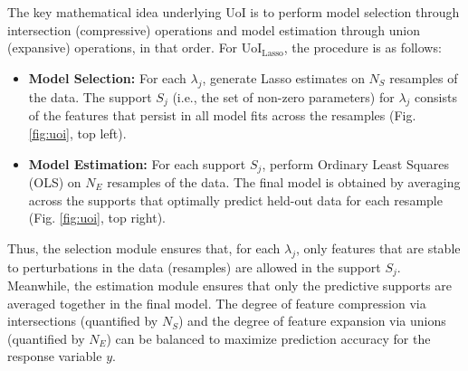 \documentclass[letterpaper, 10 pt, conference]{ieeeconf}  %
\begin{document}
The key mathematical idea underlying UoI is to perform
model selection through intersection (compressive) operations and model estimation through union (expansive) operations, in that order. For UoI$_{\text{Lasso}}$, the procedure is as follows:
\begin{itemize}
    \item \textbf{Model Selection:} For each $\lambda_j$, generate Lasso estimates on $N_S$ resamples of the data. The support $S_j$ (i.e., the set of non-zero parameters) for $\lambda_j$ consists of the features that persist in all model fits across the resamples (Fig. \ref{fig:uoi}, top left).
    \item \textbf{Model Estimation:} For each support $S_j$, perform Ordinary Least Squares (OLS) on $N_E$ resamples of the data. The final model is obtained by averaging across the supports that optimally predict held-out data for each resample (Fig. \ref{fig:uoi}, top right). 
\end{itemize}
Thus, the selection module ensures that, for each $\lambda_j$, only features that are stable to perturbations in the data (resamples) are allowed in the support $S_j$. Meanwhile, the estimation module ensures that only the predictive supports are averaged together in the final model. The degree of feature compression via intersections (quantified by $N_S$) and the degree of feature expansion via unions (quantified by $N_E$) can be balanced to maximize prediction accuracy for the response variable $y$.
\end{document}
